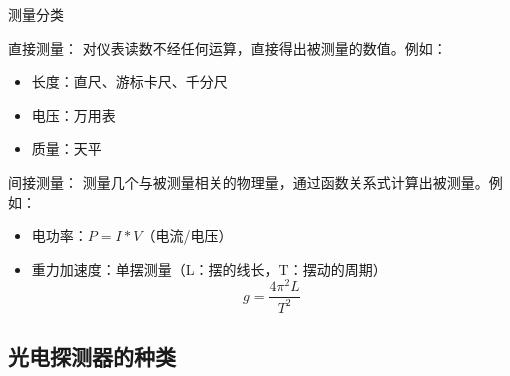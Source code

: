 \documentclass[10pt]{beamer}
\begin{document}
\begin{frame}{测量分类}
    

    \begin{alertblock}{直接测量：}
    对仪表读数不经任何运算，直接得出被测量的数值。例如：
    \end{alertblock}
        \begin{itemize}
            \item 长度：直尺、游标卡尺、千分尺
            \item 电压：万用表
            \item 质量：天平
        \end{itemize}
     \begin{alertblock}{间接测量：}
    测量几个与被测量相关的物理量，通过函数关系式计算出被测量。例如：
    \end{alertblock}
        \begin{itemize}
            \item 电功率：$P = I * V$（电流/电压）
            \item 重力加速度：单摆测量（L：摆的线长，T：摆动的周期）
            \begin{equation}
                g=\frac{4\pi^2L}{T^2}
            \end{equation}
            
        \end{itemize}
 \end{frame}    


\subsection{光电探测器的种类}
\end{document}
